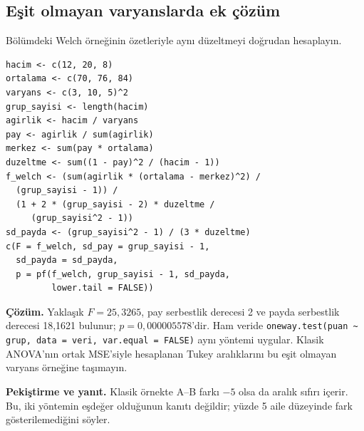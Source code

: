 \subsection*{Eşit olmayan varyanslarda ek çözüm}
Bölümdeki Welch örneğinin özetleriyle aynı düzeltmeyi doğrudan hesaplayın.

\begin{lstlisting}[style=prismR]
hacim <- c(12, 20, 8)
ortalama <- c(70, 76, 84)
varyans <- c(3, 10, 5)^2
grup_sayisi <- length(hacim)
agirlik <- hacim / varyans
pay <- agirlik / sum(agirlik)
merkez <- sum(pay * ortalama)
duzeltme <- sum((1 - pay)^2 / (hacim - 1))
f_welch <- (sum(agirlik * (ortalama - merkez)^2) /
  (grup_sayisi - 1)) /
  (1 + 2 * (grup_sayisi - 2) * duzeltme /
     (grup_sayisi^2 - 1))
sd_payda <- (grup_sayisi^2 - 1) / (3 * duzeltme)
c(F = f_welch, sd_pay = grup_sayisi - 1,
  sd_payda = sd_payda,
  p = pf(f_welch, grup_sayisi - 1, sd_payda,
         lower.tail = FALSE))
\end{lstlisting}

\textbf{Çözüm.} Yaklaşık $F=25{,}3265$, pay serbestlik derecesi 2 ve
payda serbestlik derecesi 18,1621 bulunur; $p=0{,}000005578$'dir. Ham veride
\texttt{oneway.test(puan \textasciitilde{} grup, data = veri, var.equal = FALSE)}
aynı yöntemi uygular. Klasik ANOVA'nın ortak MSE'siyle hesaplanan Tukey
aralıklarını bu eşit olmayan varyans örneğine taşımayın.

\textbf{Pekiştirme ve yanıt.} Klasik örnekte A--B farkı $-5$ olsa da
aralık sıfırı içerir. Bu, iki yöntemin eşdeğer olduğunun kanıtı değildir;
yüzde 5 aile düzeyinde fark gösterilemediğini söyler.